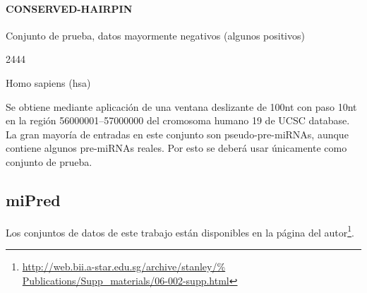 \documentclass[12pt,bibliography=oldstyle,DIV=12,parskip=half-,titlepage]{scrartcl}
\begin{document}
\paragraph{CONSERVED-HAIRPIN}
\begin{description}[style=nextline,leftmargin=3cm,align=right]
\item[Tipo:] Conjunto de prueba, datos mayormente negativos (algunos
  positivos)
\item[Núm. entradas:] 2444
\item[Especies:]  Homo sapiens (hsa)
\item[Descripción:] Se obtiene mediante aplicación de una ventana
  deslizante de 100nt con paso 10nt en la región 56000001--57000000
  del cromosoma humano 19 de UCSC database. La gran mayoría de
  entradas en este conjunto son pseudo-pre-miRNAs, aunque contiene
  algunos pre-miRNAs reales.  Por esto se deberá usar únicamente como
  conjunto de prueba.
\end{description}
%
%
%
%
%
%
%
%
\newpage
\subsection{miPred \cite{ng}}
Los conjuntos de datos de este trabajo están disponibles en la página
del autor\footnote{\url{http://web.bii.a-star.edu.sg/archive/stanley/%
Publications/Supp_materials/06-002-supp.html}}.
%
\end{document}
